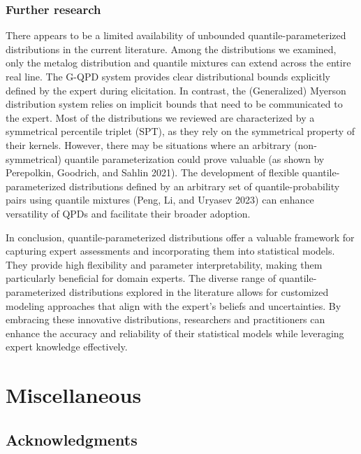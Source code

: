 \documentclass[
]{interact}
\begin{document}
\subsubsection*{Further research}\label{further-research}

There appears to be a limited availability of unbounded
quantile-parameterized distributions in the current literature. Among
the distributions we examined, only the metalog distribution and
quantile mixtures can extend across the entire real line. The G-QPD
system provides clear distributional bounds explicitly defined by the
expert during elicitation. In contrast, the (Generalized) Myerson
distribution system relies on implicit bounds that need to be
communicated to the expert. Most of the distributions we reviewed are
characterized by a symmetrical percentile triplet (SPT), as they rely on
the symmetrical property of their kernels. However, there may be
situations where an arbitrary (non-symmetrical) quantile
parameterization could prove valuable (as shown by Perepolkin, Goodrich,
and Sahlin 2021). The development of flexible quantile-parameterized
distributions defined by an arbitrary set of quantile-probability pairs
using quantile mixtures (Peng, Li, and Uryasev 2023) can enhance
versatility of QPDs and facilitate their broader adoption.

In conclusion, quantile-parameterized distributions offer a valuable
framework for capturing expert assessments and incorporating them into
statistical models. They provide high flexibility and parameter
interpretability, making them particularly beneficial for domain
experts. The diverse range of quantile-parameterized distributions
explored in the literature allows for customized modeling approaches
that align with the expert's beliefs and uncertainties. By embracing
these innovative distributions, researchers and practitioners can
enhance the accuracy and reliability of their statistical models while
leveraging expert knowledge effectively.

\section*{Miscellaneous}\label{miscellaneous}

\subsection*{Acknowledgments}\label{acknowledgments}
\end{document}
